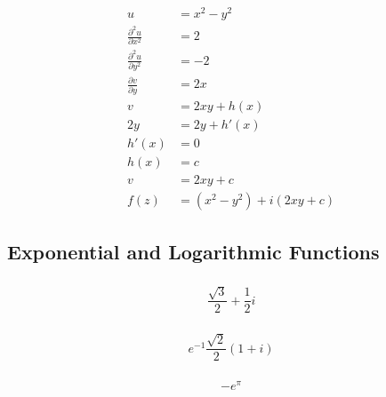 \documentclass{article}
\begin{document}
\setcounter{subsubsection}{24}
\subsubsection{}

\begin{align*}
  u                                 & = x^2 - y^2                   \\
  \frac{\partial^2 u}{\partial x^2} & = 2                           \\
  \frac{\partial^2 u}{\partial y^2} & = -2                          \\
  \frac{\partial v}{\partial y}     & = 2 x                         \\
  v                                 & = 2 x y + h(x)                \\
  2 y                               & = 2 y + h'(x)                 \\
  h'(x)                             & = 0                           \\
  h(x)                              & = c                           \\
  v                                 & = 2 x y + c                   \\
  f(z)                              & = (x^2 - y^2) + i (2 x y + c)
\end{align*}

\subsection{Exponential and Logarithmic Functions}

\subsubsection{}

\[\frac{\sqrt{3}}{2} + \frac{1}{2} i\]

\setcounter{subsubsection}{2}
\subsubsection{}

\[e^{-1} \frac{\sqrt{2}}{2} (1 + i)\]

\setcounter{subsubsection}{4}
\subsubsection{}

\[-e^\pi\]
\end{document}
